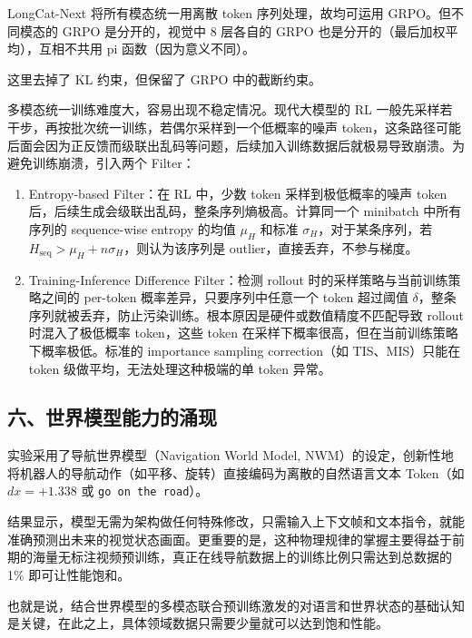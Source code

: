 LongCat-Next 将所有模态统一用离散 token 序列处理，故均可运用 GRPO。但不同模态的 GRPO 是分开的，视觉中 8 层各自的 GRPO 也是分开的（最后加权平均），互相不共用 pi 函数（因为意义不同）。

这里去掉了 KL 约束，但保留了 GRPO 中的截断约束。

多模态统一训练难度大，容易出现不稳定情况。现代大模型的 RL 一般先采样若干步，再按批次统一训练，若偶尔采样到一个低概率的噪声 token，这条路径可能后面会因为正反馈而级联出乱码等问题，后续加入训练数据后就极易导致崩溃。为避免训练崩溃，引入两个 Filter：

\begin{enumerate}
\def\labelenumi{\arabic{enumi}.}
\tightlist
\item
  Entropy-based Filter：在 RL 中，少数 token 采样到极低概率的噪声 token 后，后续生成会级联出乱码，整条序列熵极高。计算同一个 minibatch 中所有序列的 sequence-wise entropy 的均值 \(\mu_H\) 和标准 \(\sigma_H\)，对于某条序列，若 \(H_{\mathrm{seq}}>\mu_H+n\sigma_H\)，则认为该序列是 outlier，直接丢弃，不参与梯度。
\item
  Training-Inference Difference Filter：检测 rollout 时的采样策略与当前训练策略之间的 per-token 概率差异，只要序列中任意一个 token 超过阈值 \(\delta\)，整条序列就被丢弃，防止污染训练。根本原因是硬件或数值精度不匹配导致 rollout 时混入了极低概率 token，这些 token 在采样下概率很高，但在当前训练策略下概率极低。标准的 importance sampling correction（如 TIS、MIS）只能在 token 级做平均，无法处理这种极端的单 token 异常。
\end{enumerate}

\hypertarget{ux516dux4e16ux754cux6a21ux578bux80fdux529bux7684ux6d8cux73b0}{%
\subsection{六、世界模型能力的涌现}\label{ux516dux4e16ux754cux6a21ux578bux80fdux529bux7684ux6d8cux73b0}}

实验采用了导航世界模型（Navigation World Model, NWM）的设定，创新性地将机器人的导航动作（如平移、旋转）直接编码为离散的自然语言文本 Token（如 \(dx=+1.338\) 或 \texttt{go\ on\ the\ road}）。

结果显示，模型无需为架构做任何特殊修改，只需输入上下文帧和文本指令，就能准确预测出未来的视觉状态画面。更重要的是，这种物理规律的掌握主要得益于前期的海量无标注视频预训练，真正在线导航数据上的训练比例只需达到总数据的 1\% 即可让性能饱和。

也就是说，结合世界模型的多模态联合预训练激发的对语言和世界状态的基础认知是关键，在此之上，具体领域数据只需要少量就可以达到饱和性能。

